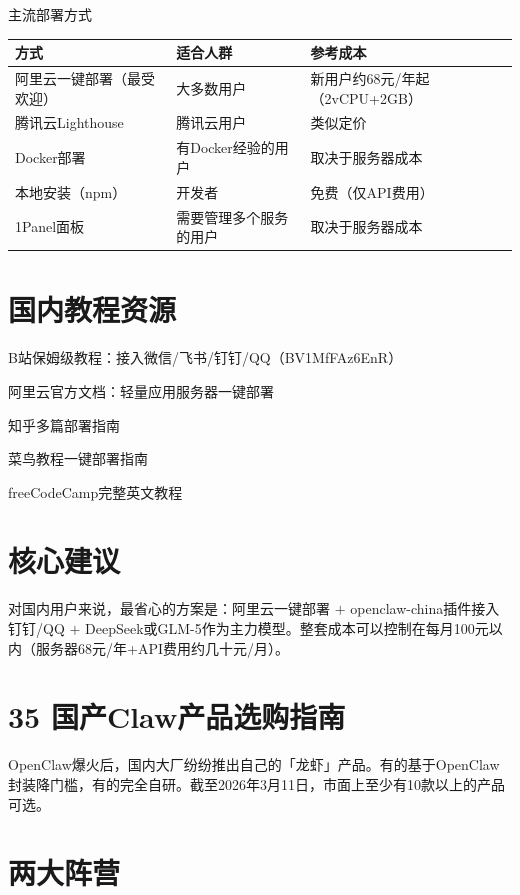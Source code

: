 \documentclass[
  10
]{article}
\newcounter{none} %
\begin{document}
主流部署方式

{\def\LTcaptype{none} %
\begin{longtable}[]{@{}|l|l|l|@{}}
\toprule\noalign{}
\endhead
\bottomrule\noalign{}
\endlastfoot
\hline
方式 & 适合人群 & 参考成本 \\
\hline
阿里云一键部署（最受欢迎） & 大多数用户 &
新用户约68元/年起（2vCPU+2GB） \\
\hline
腾讯云Lighthouse & 腾讯云用户 & 类似定价 \\
\hline
Docker部署 & 有Docker经验的用户 & 取决于服务器成本 \\
\hline
本地安装（npm） & 开发者 & 免费（仅API费用） \\
\hline
1Panel面板 & 需要管理多个服务的用户 & 取决于服务器成本 \\
\hline
\end{longtable}
}

\section{国内教程资源}\label{ux56fdux5185ux6559ux7a0bux8d44ux6e90}

B站保姆级教程：接入微信/飞书/钉钉/QQ（BV1MfFAz6EnR）

阿里云官方文档：轻量应用服务器一键部署

知乎多篇部署指南

菜鸟教程一键部署指南

freeCodeCamp完整英文教程

\section{核心建议}\label{ux6838ux5fc3ux5efaux8bae-26}

对国内用户来说，最省心的方案是：阿里云一键部署 \(+\)
openclaw-china插件接入钉钉/QQ \(+\)
DeepSeek或GLM-5作为主力模型。整套成本可以控制在每月100元以内（服务器68元/年+API费用约几十元/月）。

\section{35
国产Claw产品选购指南}\label{ux56fdux4ea7clawux4ea7ux54c1ux9009ux8d2dux6307ux5357}

OpenClaw爆火后，国内大厂纷纷推出自己的「龙虾」产品。有的基于OpenClaw封装降门槛，有的完全自研。截至2026年3月11日，市面上至少有10款以上的产品可选。

\section{两大阵营}\label{ux4e24ux5927ux9635ux8425}
\end{document}
